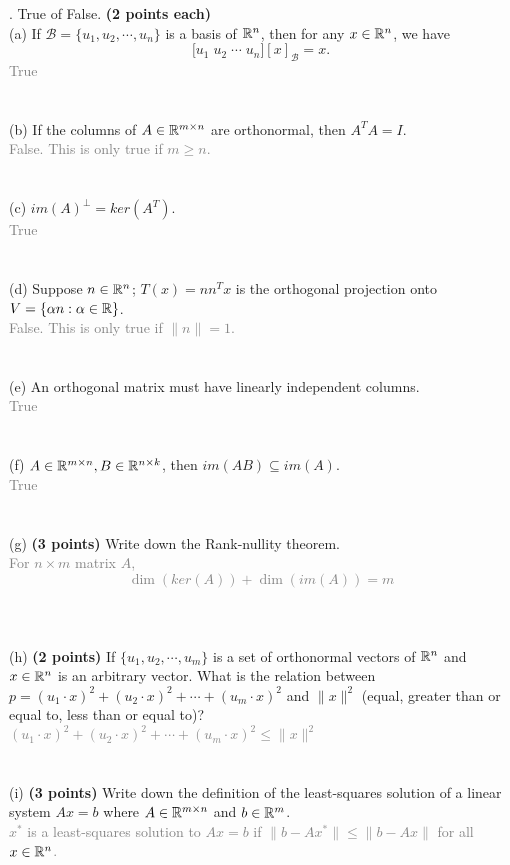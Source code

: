 \documentclass[12pt,a4paper]{article}
\newcommand{\gray}[1]{\textcolor{gray}{#1}}
\newcommand{\x}{\times}
\def\R{\ifmmode\mathbb R\fi}
\begin{document}
\newpage
{}. True of False. \textbf{(2 points each)}\\
(a) If $\mathcal B = \{u_1, u_2, \cdots, u_n\}$ is a basis of $\R^n$, then for any $x\in\R^n$, we have 
$$\Big[u_1 \; u_2 \; \cdots \; u_n\Big][x]_{\mathcal B} = x.$$
\gray{True}
\\
\\
\\
(b) If the columns of $A \in \R^{m\x n}$ are orthonormal, then $A^TA = I$. 
\gray{\\False. This is only true if $m\geq n$.}
\\
\\
\\
(c) $im(A)^\perp = ker(A^T)$. 
\gray{\\True}
\\
\\
\\
(d) Suppose $n \in \R^n$; $T(x) = nn^Tx$ is the orthogonal projection onto $V = \{\alpha n: \alpha \in \R\}$.
\gray{\\False. This is only true if $\|n\| = 1$.}
\\
\\
\\
(e) An orthogonal matrix must have linearly independent columns.
\gray{\\True}
\\
\\
\\
(f) $A \in \R^{m\x n}, B \in \R^{n\x k}$, then $im(AB) \subseteq im(A)$.
\gray{\\True}
\\
\\
\\
(g) \textbf{(3 points)} Write down the Rank-nullity theorem. 
\gray{\\For $n\x m$ matrix $A$, 
    $$\dim(ker(A)) + \dim(im(A)) = m$$
}
\\
\\
\\
(h) \textbf{(2 points)} If $\{u_1, u_2, \cdots, u_m\}$ is a set of orthonormal vectors of $\R^n$ and $x \in \R^n$ is an arbitrary vector. What is the relation between $p = (u_1\cdot x)^2 + (u_2 \cdot x)^2 + \cdots + (u_m\cdot x)^2$ and $\|x\|^2$ (equal, greater than or equal to, less than or equal to)? 
\gray{\\
$(u_1\cdot x)^2 + (u_2 \cdot x)^2 + \cdots + (u_m\cdot x)^2 \leq \|x\|^2$}
\\
\\
\\
(i) \textbf{(3 points)} Write down the definition of the least-squares solution of a linear system $Ax = b$ where $A\in\R^{m\x n}$ and $b\in\R^m$. 
\gray{\\$x^\ast$ is a least-squares solution to $Ax=b$ if $\|b-Ax^\ast\| \leq \|b-Ax\|$ for all $x \in \R^n$.}
\\
\\
\\
\end{document}
